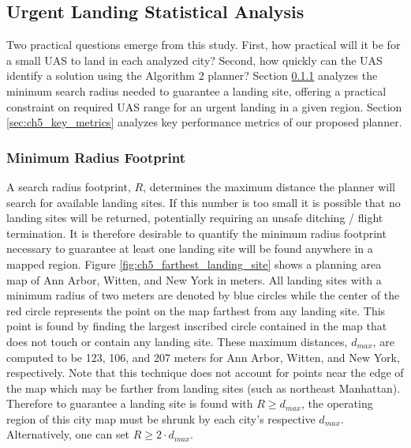 \subsection{Urgent Landing Statistical Analysis}\label{sec:ch5_meta_analysis}

Two practical questions emerge from this study.  First, how practical will it be for a small \ac{UAS} to land in each analyzed city?  Second, how quickly can the \ac{UAS} identify a solution using the Algorithm 2 planner?  Section \ref{sec:ch5_footprints} analyzes the minimum search radius needed to guarantee a landing site, offering a practical constraint on required \ac{UAS} range for an urgent landing in a given region. Section \ref{sec:ch5_key_metrics} analyzes key performance metrics of our proposed planner.

\subsubsection{Minimum Radius Footprint}\label{sec:ch5_footprints}

A search radius footprint, $R$, determines the maximum distance the planner will search for available landing sites.  If this number is too small it is possible that no landing sites will be returned, potentially requiring an unsafe ditching / flight termination. It is therefore desirable to quantify the minimum radius footprint necessary to guarantee at least one landing site will be found anywhere in a mapped region.  Figure \ref{fig:ch5_farthest_landing_site} shows a planning area map of Ann Arbor, Witten, and New York in meters. All landing sites with a minimum radius of two meters are denoted by blue circles while the center of the red circle represents the point on the map farthest  from any landing site. This point is found by finding the largest inscribed circle contained in the map that does not touch or contain any landing site. These maximum distances, $d_{max}$, are computed to be 123, 106, and 207 meters for Ann Arbor, Witten, and New York, respectively. Note that this technique does not account for points near the edge of the map which may be farther from landing sites (such as northeast Manhattan).  Therefore to guarantee a landing site is found with $R \ge d_{max}$, the operating region of this city map must be shrunk by each city's respective $d_{max}$. Alternatively, one can set $R \ge 2 \cdot d_{max}$.


